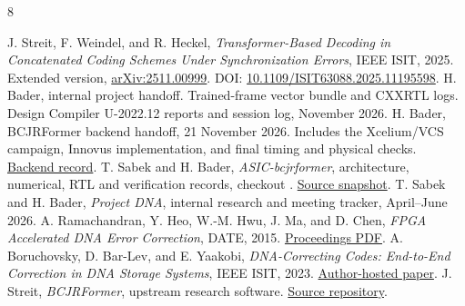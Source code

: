 \begin{thebibliography}{8}
\small\raggedright
\setlength{\itemsep}{2pt}
 J. Streit, F. Weindel, and R. Heckel, \emph{Transformer-Based Decoding in Concatenated Coding Schemes Under Synchronization Errors}, IEEE ISIT, 2025. Extended version, \href{https://arxiv.org/abs/2511.00999}{arXiv:2511.00999}. DOI: \href{https://doi.org/10.1109/ISIT63088.2025.11195598}{10.1109/ISIT63088.2025.11195598}.
 H. Bader, internal project handoff. Trained-frame vector bundle and CXXRTL logs. Design Compiler U-2022.12 reports and session log, November 2026.
 H. Bader, BCJRFormer backend handoff, 21 November 2026. Includes the Xcelium/VCS campaign, Innovus implementation, and final timing and physical checks. \href{https://github.com/taymor3/ASIC-bcjrformer/blob/2ed8c31d2eb7fd576a8cf88328f66f4b4b4a591f/docs/BCJRFormer_BE_HANDOFF_2026-11-21.md}{Backend record}.
 T. Sabek and H. Bader, \emph{ASIC-bcjrformer}, architecture, numerical, RTL and verification records, checkout . \href{https://github.com/taymor3/ASIC-bcjrformer/tree/70e82e6d9415c6c377c7cad7b49c4de3c7240411}{Source snapshot}.
 T. Sabek and H. Bader, \emph{Project DNA}, internal research and meeting tracker, April--June 2026.
 A. Ramachandran, Y. Heo, W.-M. Hwu, J. Ma, and D. Chen, \emph{FPGA Accelerated DNA Error Correction}, DATE, 2015. \href{https://past.date-conference.com/proceedings-archive/2015/pdf/0983.pdf}{Proceedings PDF}.
 A. Boruchovsky, D. Bar-Lev, and E. Yaakobi, \emph{DNA-Correcting Codes: End-to-End Correction in DNA Storage Systems}, IEEE ISIT, 2023. \href{https://yaakobi.net.technion.ac.il/files/2024/02/148_DNA_ECC_ISIT23.pdf}{Author-hosted paper}.
 J. Streit, \emph{BCJRFormer}, upstream research software. \href{https://github.com/streit-julian/BCJRFormer}{Source repository}.
\end{thebibliography}
